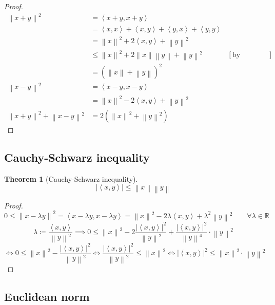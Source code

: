 \documentclass{article}
\newtheorem{theorem}{Theorem}  \numberwithin{theorem}{section}
\newcommand{\angel}[1]{\left\langle#1\right\rangle}
\newcommand{\norm}[1]{\left\|#1\right\|}
\newcommand{\card}[1]{\left|#1\right|}
\begin{document}
\begin{proof}
  \begin{align*}
    \norm{x + y}^2
      &= \angel{x+y, x+y} \\
      &= \angel{x,x} + \angel{x,y} + \angel{y,x} + \angel{y,y} \\
      &= \norm{x}^2 + 2\angel{x,y} + \norm{y}^2 \\
      &\leq \norm{x}^2 + 2 \norm{x} \norm{y} + \norm{y}^2  & [\text{by Cauchy-Schwarz ineq.}] \\
      &= (\norm{x} + \norm{y})^2 \\
    \norm{x - y}^2
      &= \angel{x - y, x - y} \\
      &= \norm{x}^2 - 2\angel{x,y} + \norm{y}^2 \\
    \norm{x + y}^2 + \norm{x - y}^2
      &= 2 \left(\norm{x}^2 + \norm{y}^2\right)
  \end{align*}
\end{proof}

\subsection{Cauchy-Schwarz inequality}

\begin{theorem}[Cauchy-Schwarz inequality]
  \[ \card{\angel{x, y}} \leq \norm{x} \norm{y} \]
\end{theorem}
\begin{proof}
  \[ 0 \leq \norm{x - \lambda y}^2 = \angel{x - \lambda y, x - \lambda y} = \norm{x}^2 - 2\lambda \angel{x, y} + \lambda^2 \norm{y}^2 \qquad \forall \lambda \in \mathbb R \]
  \[
    \lambda \coloneqq \frac{\angel{x, y}}{\norm{y}^2}
    \implies 0 \leq \norm{x}^2 - 2 \frac{\card{\angel{x, y}}^2}{\norm{y}^2} + \frac{\card{\angel{x, y}}^2}{\norm{y}^4} \cdot \norm{y}^2
  \]
  \[
    \iff 0 \leq \norm{x}^2 - \frac{\card{\angel{x, y}}^2}{\norm{y}^2}
    \iff \frac{\card{\angel{x, y}}^2}{\norm{y}^2} \leq \norm{x}^2
    \iff \card{\angel{x, y}}^2 \leq \norm{x}^2 \cdot \norm{y}^2
  \]
\end{proof}

\subsection{Euclidean norm}
\end{document}
